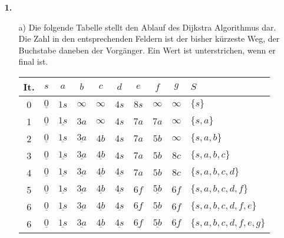 \documentclass [a4paper,11pt]{article}
\author{\authorinfotitle}
\title{\titleinfo}
\date{\today}
\begin{document}
\maketitle
\begin{enumerate}
    \item[\textbf{1.}]
        \begin{enumerate}
        \item[a)]
            Die folgende Tabelle stellt den Ablauf des Dijkstra Algorithmus dar. Die Zahl in den entsprechenden Feldern ist der bisher kürzeste Weg,
            der Buchstabe daneben der Vorgänger. Ein Wert ist unterstrichen, wenn er final ist.
            \begin{table}[h]
                \centering
                \begin{tabular}{c||c|c|c|c|c|c|c|c||l}
                    It. & $s$ & $a$ & $b$ & $c$ & $d$ & $e$ & $f$ & $g$ & $S$ \\
                    \hline
                    0 & $\underline{0}$ & $1s$ & $\infty$ & $\infty$ & $4s$ & $8s$ & $\infty$ & $\infty$ & $\{s\}$ \\
                    1 & $\underline{0}$ & $\underline{1s}$ & $3a$ & $\infty$ & $4s$ & $7a$ & $7a$ & $\infty$ & $\{s, a\}$ \\
                    2 & $\underline{0}$ & $\underline{1s}$ & $\underline{3a}$ & $4b$ & $4s$ & $7a$ & $5b$ & $\infty$ & $\{s, a, b\}$ \\
                    3 & $\underline{0}$ & $\underline{1s}$ & $\underline{3a}$ & $\underline{4b}$ & $4s$ & $7a$ & $5b$ & $8c$ & $\{s, a, b, c\}$ \\
                    4 & $\underline{0}$ & $\underline{1s}$ & $\underline{3a}$ & $\underline{4b}$ & $\underline{4s}$ & $7a$ & $5b$ & $8c$ & $\{s, a, b, c, d\}$ \\
                    5 & $\underline{0}$ & $\underline{1s}$ & $\underline{3a}$ & $\underline{4b}$ & $\underline{4s}$ & $6f$ & $\underline{5b}$ & $6f$ & $\{s, a, b, c, d, f\}$ \\
                    6 & $\underline{0}$ & $\underline{1s}$ & $\underline{3a}$ & $\underline{4b}$ & $\underline{4s}$ & $\underline{6f}$ & $\underline{5b}$ & $6f$ & $\{s, a, b, c, d, f, e\}$ \\
                    6 & $\underline{0}$ & $\underline{1s}$ & $\underline{3a}$ & $\underline{4b}$ & $\underline{4s}$ & $\underline{6f}$ & $\underline{5b}$ & $\underline{6f}$ & $\{s, a, b, c, d, f, e, g\}$ \\
                \end{tabular}
            \end{table}


\end{enumerate}
\end{enumerate}
\end{document}
